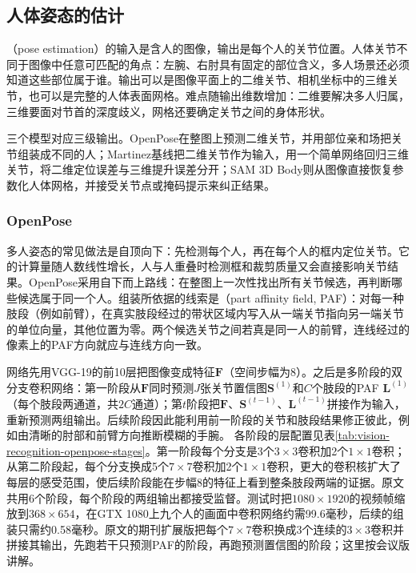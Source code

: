 \subsection{人体姿态的估计}
\label{sec:vision-recognition-pose}

（pose estimation）的输入是含人的图像，输出是每个人的关节位置。人体关节不同于图像中任意可匹配的角点：左腕、右肘具有固定的部位含义，多人场景还必须知道这些部位属于谁。输出可以是图像平面上的二维关节、相机坐标中的三维关节，也可以是完整的人体表面网格。难点随输出维数增加：二维要解决多人归属，三维要面对节首的深度歧义，网格还要确定关节之间的身体形状。

三个模型对应三级输出。OpenPose在整图上预测二维关节，并用部位亲和场把关节组装成不同的人；Martinez基线把二维关节作为输入，用一个简单网络回归三维关节，将二维定位误差与三维提升误差分开；SAM 3D Body则从图像直接恢复参数化人体网格，并接受关节点或掩码提示来纠正结果。

\subsubsection{OpenPose}
\label{sec:vision-recognition-openpose}

多人姿态的常见做法是自顶向下：先检测每个人，再在每个人的框内定位关节。它的计算量随人数线性增长，人与人重叠时检测框和裁剪质量又会直接影响关节结果。OpenPose采用自下而上路线：在整图上一次性找出所有关节候选，再判断哪些候选属于同一个人。组装所依据的线索是（part affinity field, PAF）：对每一种肢段（例如前臂），在真实肢段经过的带状区域内写入从一端关节指向另一端关节的单位向量，其他位置为零。两个候选关节之间若真是同一人的前臂，连线经过的像素上的PAF方向就应与连线方向一致。

网络先用VGG-19的前10层把图像变成特征$\bm{F}$（空间步幅为8）。之后是多阶段的双分支卷积网络：第一阶段从$\bm{F}$同时预测$J$张关节置信图$\bm{S}^{(1)}$和$C$个肢段的PAF $\bm{L}^{(1)}$（每个肢段两通道，共$2C$通道）；第$t$阶段把$\bm{F}$、$\bm{S}^{(t-1)}$、$\bm{L}^{(t-1)}$拼接作为输入，重新预测两组输出。后续阶段因此能利用前一阶段的关节和肢段结果修正彼此，例如由清晰的肘部和前臂方向推断模糊的手腕。
各阶段的层配置见表\ref{tab:vision-recognition-openpose-stages}。第一阶段每个分支是3个$3\times3$卷积加2个$1\times1$卷积；从第二阶段起，每个分支换成5个$7\times7$卷积加2个$1\times1$卷积，更大的卷积核扩大了每层的感受范围，使后续阶段能在步幅8的特征上看到整条肢段两端的证据。原文共用6个阶段，每个阶段的两组输出都接受监督。测试时把$1080\times1920$的视频帧缩放到$368\times654$，在GTX 1080上九个人的画面中卷积网络约需99.6毫秒，后续的组装只需约0.58毫秒。原文的期刊扩展版把每个$7\times7$卷积换成3个连续的$3\times3$卷积并拼接其输出，先跑若干只预测PAF的阶段，再跑预测置信图的阶段；这里按会议版讲解。

